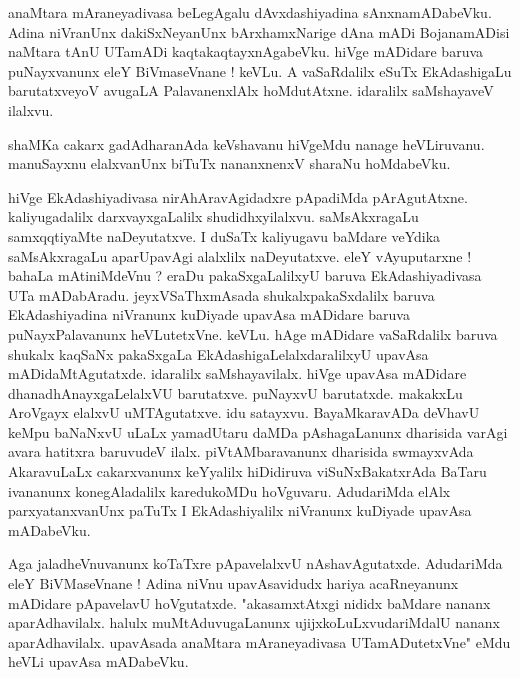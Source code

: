 \documentclass{article}
\begin{document}
\begin{mn}%
anaMtara mAraneyadivasa beLegAgalu dAvxdashiyadina sAnxnamADabeVku. Adina niVranUnx dakiSxNeyanUnx 
bArxhamxNarige dAna mADi BojanamADisi naMtara tAnU UTamADi kaqtakaqtayxnAgabeVku. hiVge mADidare 
baruva puNayxvanunx eleY BiVmaseVnane ! keVLu. A vaSaRdalilx eSuTx EkAdashigaLu barutatxveyoV 
avugaLA PalavanenxlAlx hoMdutAtxne. idaralilx saMshayaveV ilalxvu.
\end{mn}

\begin{mn}%
shaMKa cakarx gadAdharanAda keVshavanu hiVgeMdu nanage heVLiruvanu. manuSayxnu elalxvanUnx biTuTx 
nananxnenxV sharaNu hoMdabeVku.
\end{mn}

\begin{mn}%
hiVge EkAdashiyadivasa nirAhAravAgidadxre pApadiMda pArAgutAtxne. kaliyugadalilx darxvayxgaLalilx 
shudidhxyilalxvu. saMsAkxragaLu samxqqtiyaMte naDeyutatxve. I duSaTx kaliyugavu baMdare veYdika 
saMsAkxragaLu aparUpavAgi alalxlilx naDeyutatxve. eleY vAyuputarxne ! bahaLa mAtiniMdeVnu ? eraDu 
pakaSxgaLalilxyU baruva EkAdashiyadivasa UTa mADabAradu. jeyxVSaThxmAsada shukalxpakaSxdalilx 
baruva EkAdashiyadina niVranunx kuDiyade upavAsa mADidare baruva puNayxPalavanunx heVLutetxVne. 
keVLu. hAge mADidare vaSaRdalilx baruva shukalx kaqSaNx pakaSxgaLa EkAdashigaLelalxdaralilxyU 
upavAsa mADidaMtAgutatxde. idaralilx saMshayavilalx. hiVge upavAsa mADidare dhanadhAnayxgaLelalxVU 
barutatxve. puNayxvU barutatxde. makakxLu AroVgayx elalxvU uMTAgutatxve. idu satayxvu. 
BayaMkaravADa deVhavU keMpu baNaNxvU uLaLx yamadUtaru daMDa pAshagaLanunx dharisida varAgi avara 
hatitxra baruvudeV ilalx. piVtAMbaravanunx dharisida swmayxvAda AkaravuLaLx cakarxvanunx keYyalilx 
hiDidiruva viSuNxBakatxrAda BaTaru ivananunx konegAladalilx karedukoMDu hoVguvaru. AdudariMda 
elAlx parxyatanxvanUnx paTuTx I EkAdashiyalilx niVranunx kuDiyade upavAsa mADabeVku.	
\end{mn}

\begin{mn}%
Aga jaladheVnuvanunx koTaTxre pApavelalxvU nAshavAgutatxde. AdudariMda eleY BiVMaseVnane ! Adina 
niVnu upavAsavidudx hariya acaRneyanunx mADidare pApavelavU hoVgutatxde. "akasamxtAtxgi nididx 
baMdare nananx aparAdhavilalx. halulx muMtAduvugaLanunx ujijxkoLuLxvudariMdalU nananx 
aparAdhavilalx. upavAsada anaMtara mAraneyadivasa UTamADutetxVne" eMdu heVLi upavAsa mADabeVku.
\end{mn}
\end{document}

